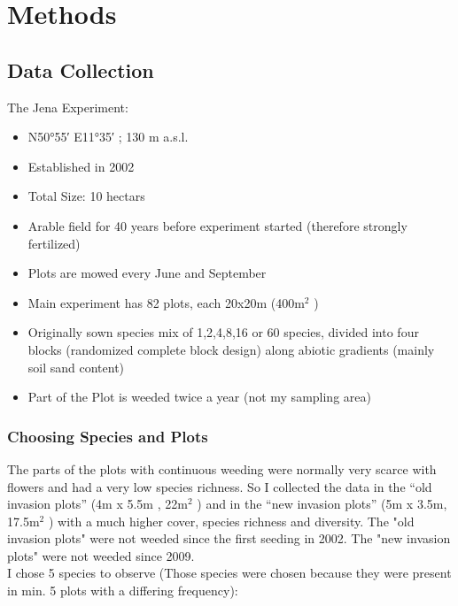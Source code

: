\label{ch:methods}

\section{Methods}

\subsection{Data Collection}

The Jena Experiment:

\begin{itemize}
\item N\ang{50;55;} E\ang{11;35;} ; 130 m a.s.l.
\item	Established in 2002
\item	Total Size: 10 hectars
\item	Arable field for 40 years before experiment started (therefore strongly fertilized)
\item	Plots are mowed every June and September
\item	Main experiment has 82 plots, each 20x20m (400m$^2$ )
\item	Originally sown species mix of 1,2,4,8,16 or 60 species, divided into four blocks (randomized complete block design) along abiotic gradients (mainly soil sand content)
\item	Part of the Plot is weeded twice a year (not my sampling area)
\end{itemize}


\subsubsection{Choosing Species and Plots}

The parts of the plots with continuous weeding were normally very scarce with flowers and had a very low species richness. So I collected the data in the “old invasion plots” (4m x 5.5m , 22m$^2$ ) and in the “new invasion plots” (5m x 3.5m, 17.5m$^2$ ) with a much higher cover, species richness and diversity. The "old invasion plots" were not weeded since the first seeding in 2002. The "new invasion plots" were not weeded since 2009.\\

I chose 5 species to observe (Those species were chosen because they were present in min. 5 plots with a differing frequency):


